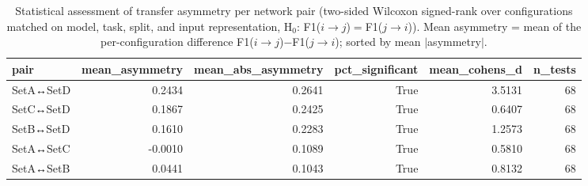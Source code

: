 \begin{table}
\caption{Statistical assessment of transfer asymmetry per network pair (two-sided Wilcoxon signed-rank over configurations matched on model, task, split, and input representation, H$_0$: F1($i\to j$)$=$F1($j\to i$)). Mean asymmetry = mean of the per-configuration difference F1($i\to j$)$-$F1($j\to i$); sorted by mean $|$asymmetry$|$.}
\label{tab:q4_stats}
\begin{tabular}{lrrrrr}
\toprule
pair & mean_asymmetry & mean_abs_asymmetry & pct_significant & mean_cohens_d & n_tests \\
\midrule
SetA↔SetD & 0.2434 & 0.2641 & True & 3.5131 & 68 \\
SetC↔SetD & 0.1867 & 0.2425 & True & 0.6407 & 68 \\
SetB↔SetD & 0.1610 & 0.2283 & True & 1.2573 & 68 \\
SetA↔SetC & -0.0010 & 0.1089 & True & 0.5810 & 68 \\
SetA↔SetB & 0.0441 & 0.1043 & True & 0.8132 & 68 \\
\bottomrule
\end{tabular}
\end{table}
